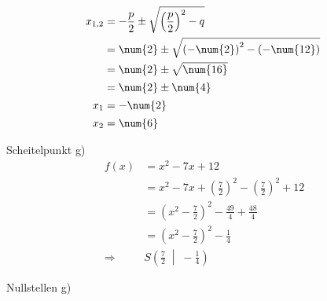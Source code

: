 \begin{exercise}
\begin{minipage}[t]{0.49\linewidth}
\begin{alignat*}{3}
          \nomod
          \\
          \noeq
          &
          x_{1,2}&=-\frac{p}{2}\pm\sqrt{\left(\frac{p}{2}\right)^2-q}
          &
          \nomod
          \\
          \noeq
          &
          &=\num{2}\pm\sqrt{\left(-\num{2}\right)^2-\left(-\num{12}\right)}
          &
          \nomod
          \\
          \noeq
          &
          &=\num{2}\pm\sqrt{\num{16}}
          &
          \nomod
          \\
          \noeq
          &
          &=\num{2}\pm\num{4}
          &
          \nomod
          \\
          \noeq
          &
          x_1&=-\num{2}
          &
          \nomod
          \\
          \noeq
          &
          x_2&=\num{6}
          &
          \nomod
        \end{alignat*}
      \endgroup
    \end{minipage}\bigskip\par
    \begin{minipage}[t]{0.49\linewidth}
      Scheitelpunkt g)
      \small
      \begin{equation*}
        \begin{split}
          f(x)&=x^2-7x+12
          \\
          &=x^2-7x+\left(\frac{7}{2}\right)^2-\left(\frac{7}{2}\right)^2+12
          \\
          &=\left(x^2-\frac{7}{2}\right)^2-\frac{49}{4}+\frac{48}{4}
          \\
          &=\left(x^2-\frac{7}{2}\right)^2-\frac{1}{4}
          \\[1ex]
          \Rightarrow\quad&S\left(\frac{7}{2}\;\middle|\;-\frac{1}{4}\right)
        \end{split}
      \end{equation*}
    \end{minipage}%
    \hfill
    \begin{minipage}[t]{0.49\linewidth}
      Nullstellen g)
      \small
      \begingroup
        \newcommand{\vstrut}{\vphantom{\left(f_0^0\right)}}%
        \newcommand{\noeq}{\phantom{\Leftrightarrow}\vstrut&\quad}%
        \newcommand{\iseq}{\Leftrightarrow\vstrut&\quad}%
        \newcommand{\impl}{\Rightarrow\vstrut&\quad}%
        \newcommand{\nomod}{\quad&\phantom{|}}%
        \newcommand{\domod}[1]{\quad&|#1}%

\end{minipage}
\end{exercise}
